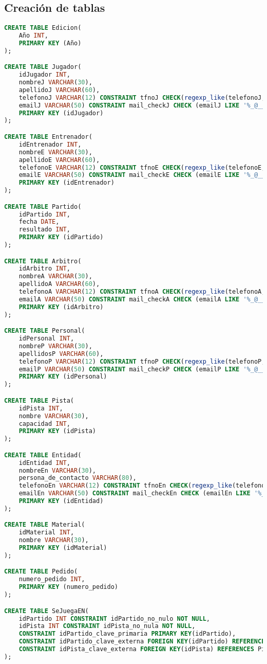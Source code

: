 \subsection{Creación de tablas}
\begin{lstlisting}[language=sql]
CREATE TABLE Edicion(
	Año INT,
	PRIMARY KEY (Año)
);

CREATE TABLE Jugador(
	idJugador INT,
	nombreJ VARCHAR(30),
	apellidoJ VARCHAR(60),
	telefonoJ VARCHAR(12) CONSTRAINT tfnoJ CHECK(regexp_like(telefonoJ,'^[/+]?[0-9]')),
	emailJ VARCHAR(50) CONSTRAINT mail_checkJ CHECK (emailJ LIKE '%_@__%.__%'),
	PRIMARY KEY (idJugador)
);

CREATE TABLE Entrenador(
	idEntrenador INT,
	nombreE VARCHAR(30),
	apellidoE VARCHAR(60),
	telefonoE VARCHAR(12) CONSTRAINT tfnoE CHECK(regexp_like(telefonoE,'^[/+]?[0-9]')),
	emailE VARCHAR(50) CONSTRAINT mail_checkE CHECK (emailE LIKE '%_@__%.__%'),
	PRIMARY KEY (idEntrenador)
);

CREATE TABLE Partido(
	idPartido INT,
	fecha DATE,
	resultado INT,
	PRIMARY KEY (idPartido)
);

CREATE TABLE Arbitro(
	idArbitro INT,
	nombreA VARCHAR(30),
	apellidoA VARCHAR(60),
	telefonoA VARCHAR(12) CONSTRAINT tfnoA CHECK(regexp_like(telefonoA,'^[/+]?[0-9]')),
	emailA VARCHAR(50) CONSTRAINT mail_checkA CHECK (emailA LIKE '%_@__%.__%'),
	PRIMARY KEY (idArbitro)
);

CREATE TABLE Personal(
	idPersonal INT,
	nombreP VARCHAR(30),
	apellidosP VARCHAR(60),
	telefonoP VARCHAR(12) CONSTRAINT tfnoP CHECK(regexp_like(telefonoP,'^[/+]?[0-9]')),
	emailP VARCHAR(50) CONSTRAINT mail_checkP CHECK (emailP LIKE '%_@__%.__%'),
	PRIMARY KEY (idPersonal)
);

CREATE TABLE Pista(
	idPista INT,
	nombre VARCHAR(30),
	capacidad INT,
	PRIMARY KEY (idPista)
);

CREATE TABLE Entidad(
	idEntidad INT,
	nombreEn VARCHAR(30),
	persona_de_contacto VARCHAR(80),
	telefonoEn VARCHAR(12) CONSTRAINT tfnoEn CHECK(regexp_like(telefonoEn,'^[/+]?[0-9]')),
	emailEn VARCHAR(50) CONSTRAINT mail_checkEn CHECK (emailEn LIKE '%_@__%.__%'),
	PRIMARY KEY (idEntidad)
);

CREATE TABLE Material(
	idMaterial INT,
	nombre VARCHAR(30),
	PRIMARY KEY (idMaterial)
);

CREATE TABLE Pedido(
	numero_pedido INT,
	PRIMARY KEY (numero_pedido)
);

CREATE TABLE SeJuegaEN(
	idPartido INT CONSTRAINT idPartido_no_nulo NOT NULL,
	idPista INT CONSTRAINT idPista_no_nula NOT NULL,
	CONSTRAINT idPartido_clave_primaria PRIMARY KEY(idPartido),
	CONSTRAINT idPartido_clave_externa FOREIGN KEY(idPartido) REFERENCES Partido(idPartido),
	CONSTRAINT idPista_clave_externa FOREIGN KEY(idPista) REFERENCES Pista(idPista)
);


\end{lstlisting}

